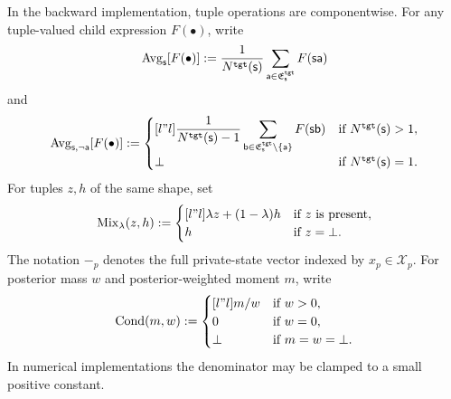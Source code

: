 \documentclass[12pt, a4paper]{article}
\begin{document}
In the backward implementation, tuple operations are componentwise.
For any tuple-valued child expression $F(\bullet)$, write
\[
  \operatorname{Avg}_{\mathsf{s}}[F(\bullet)]
  :=
  \frac{1}{N^{\tt tgt}(\mathsf{s})}
  \sum_{\mathsf{a}\in\mathfrak{E}^{\tt tgt}_{\mathsf{s}}}F(\mathsf{s}\mathsf{a})
\]
and
\[
  \operatorname{Avg}_{\mathsf{s},\neg\mathsf{a}}[F(\bullet)]
  :=
  \begin{cases}[l"l]
    \displaystyle
    \frac{1}{N^{\tt tgt}(\mathsf{s})-1}
    \sum_{\mathsf{b}\in\mathfrak{E}^{\tt tgt}_{\mathsf{s}}\setminus\{\mathsf{a}\}}F(\mathsf{s}\mathsf{b})
    & \textnormal{if }N^{\tt tgt}(\mathsf{s})>1,\\
    \bot & \textnormal{if }N^{\tt tgt}(\mathsf{s})=1.
  \end{cases}
\]
For tuples $z,h$ of the same shape, set
\[
  \operatorname{Mix}_{\lambda}(z,h)
  :=
  \begin{cases}[l"l]
    \lambda z+(1-\lambda)h & \textnormal{if }z\textnormal{ is present},\\
    h & \textnormal{if }z=\bot.
  \end{cases}
\]
The notation $-_p$ denotes the full private-state vector indexed by $x_p\in\mathcal X_p$.
For posterior mass $w$ and posterior-weighted moment $m$, write
\[
  \operatorname{Cond}(m,w):=
  \begin{cases}[l"l]
    m/w & \textnormal{if }w>0,\\
    0 & \textnormal{if }w=0,\\
    \bot & \textnormal{if }m=w=\bot.
  \end{cases}
\]
In numerical implementations the denominator may be clamped to a small positive constant.
\end{document}
